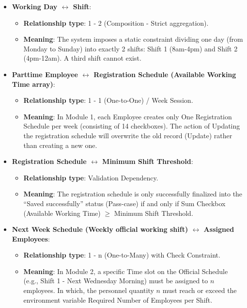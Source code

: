 \begin{itemize}
    \item \textbf{Working Day $\leftrightarrow$ Shift}:
    \begin{itemize}
        \item \textbf{Relationship type}: 1 - 2 (Composition - Strict aggregation).
        \item \textbf{Meaning}: The system imposes a static constraint dividing one day (from Monday to Sunday) into exactly 2 shifts: Shift 1 (8am-4pm) and Shift 2 (4pm-12am). A third shift cannot exist.
    \end{itemize}

    \item \textbf{Parttime Employee $\leftrightarrow$ Registration Schedule (Available Working Time array)}:
    \begin{itemize}
        \item \textbf{Relationship type}: 1 - 1 (One-to-One) / Week Session.
        \item \textbf{Meaning}: In Module 1, each Employee creates only One Registration Schedule per week (consisting of 14 checkboxes). The action of Updating the registration schedule will overwrite the old record (Update) rather than creating a new one.
    \end{itemize}

    \item \textbf{Registration Schedule $\leftrightarrow$ Minimum Shift Threshold}:
    \begin{itemize}
        \item \textbf{Relationship type}: Validation Dependency.
        \item \textbf{Meaning}: The registration schedule is only successfully finalized into the ``Saved successfully'' status (Pass-case) if and only if Sum Checkbox (Available Working Time) $\geq$ Minimum Shift Threshold.
    \end{itemize}

    \item \textbf{Next Week Schedule (Weekly official working shift) $\leftrightarrow$ Assigned Employees}:
    \begin{itemize}
        \item \textbf{Relationship type}: 1 - n (One-to-Many) with Check Constraint.
        \item \textbf{Meaning}: In Module 2, a specific Time slot on the Official Schedule (e.g., Shift 1 - Next Wednesday Morning) must be assigned to $n$ employees. In which, the personnel quantity $n$ must reach or exceed the environment variable Required Number of Employees per Shift.
    \end{itemize}
\end{itemize}

